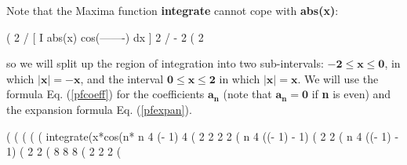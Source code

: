 \documentclass[12pt]{article}
\begin{document}
\noindent Note that the Maxima function \textbf{integrate} cannot cope with \textbf{abs(x)}:
\begin{myVerbatim}
(%
                           2
                          /
                          [               %
                          I    abs(x) cos(-------) dx
                          ]                  2
                          /
                           - 2
(%
                                       2
\end{myVerbatim}
so we will split up the region of integration into two sub-intervals:
  $\mathbf{-2 \leq x \leq 0}$, in which $\mathbf{\vert x \vert = -x}$, and  the interval 
   $\mathbf{0 \leq x \leq  2}$ in which $\mathbf{\vert x \vert = x}$.
We will use the formula Eq. (\ref{pfcoeff})   for the coefficients $\mathbf{a_{n}}$
  (note that $\mathbf{a_{n} = 0}$ if \textbf{n} is even)
  and the expansion formula Eq. (\ref{pfexpan}).
\begin{myVerbatim}
(%
(%
(%
(%
(%
           integrate(x*cos(n*%
                                     n
                              4 (- 1)       4
(%
                                 2  2       2  2
(%
                                        n
                                4 ((- 1)  - 1)
(%
                                      2  2
(%
                                            n
                                    4 ((- 1)  - 1)
(%
                                          2  2
(%
                          8           8             8
(%
                            2            2             2
(%
\end{myVerbatim}
\newpage
\end{document}
